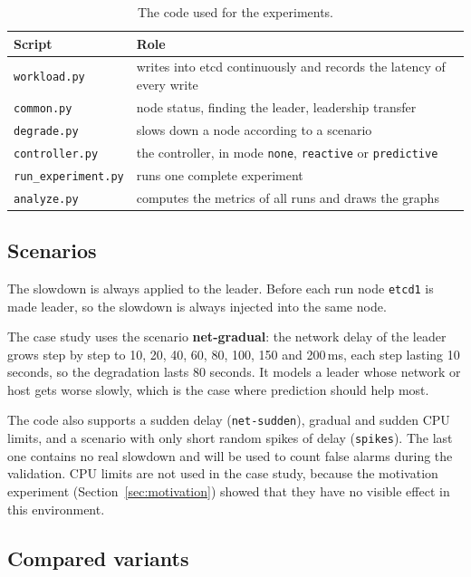\documentclass[11pt,a4paper]{article}
\begin{document}
\begin{table}[H]
\centering
\small
\begin{tabular}{ll}
\toprule
Script & Role \\
\midrule
\texttt{workload.py}       & writes into etcd continuously and records the latency of every write \\
\texttt{common.py}         & node status, finding the leader, leadership transfer \\
\texttt{degrade.py}        & slows down a node according to a scenario \\
\texttt{controller.py}     & the controller, in mode \texttt{none}, \texttt{reactive} or \texttt{predictive} \\
\texttt{run\_experiment.py} & runs one complete experiment \\
\texttt{analyze.py}        & computes the metrics of all runs and draws the graphs \\
\bottomrule
\end{tabular}
\caption{The code used for the experiments.}
\end{table}

\subsection{Scenarios}

The slowdown is always applied to the leader. Before each run node \texttt{etcd1} is made leader, so the slowdown is always injected into the same node.

The case study uses the scenario \textbf{net-gradual}: the network delay of the leader grows step by step to 10, 20, 40, 60, 80, 100, 150 and 200\,ms, each step lasting 10 seconds, so the degradation lasts 80 seconds. It models a leader whose network or host gets worse slowly, which is the case where prediction should help most.

The code also supports a sudden delay (\texttt{net-sudden}), gradual and sudden CPU limits, and a scenario with only short random spikes of delay (\texttt{spikes}). The last one contains no real slowdown and will be used to count false alarms during the validation. CPU limits are not used in the case study, because the motivation experiment (Section~\ref{sec:motivation}) showed that they have no visible effect in this environment.

\subsection{Compared variants}
\end{document}
